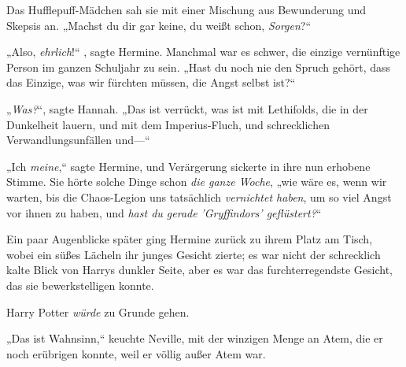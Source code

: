 Das Hufflepuff-Mädchen sah sie mit einer Mischung aus Bewunderung und Skepsis an. „Machst du dir gar keine, du weißt schon, \emph{Sorgen}?“

„Also, \emph{ehrlich}!“ , sagte Hermine. Manchmal war es schwer, die einzige vernünftige Person im ganzen Schuljahr zu sein. „Hast du noch nie den Spruch gehört, dass das Einzige, was wir fürchten müssen, die Angst selbst ist?“

„\emph{Was?}“, sagte Hannah. „Das ist verrückt, was ist mit Lethifolds, die in der Dunkelheit lauern, und mit dem Imperius-Fluch, und schrecklichen Verwandlungsunfällen und—“

„Ich \emph{meine},“ sagte Hermine, und Verärgerung sickerte in ihre nun erhobene Stimme. Sie hörte solche Dinge schon \emph{die ganze Woche}, „wie wäre es, wenn wir warten, bis die Chaos-Legion uns tatsächlich \emph{vernichtet haben}, um so viel Angst vor ihnen zu haben, und \emph{hast du gerade} \emph{'Gryffindors' geflüstert?}“

Ein paar Augenblicke später ging Hermine zurück zu ihrem Platz am Tisch, wobei ein süßes Lächeln ihr junges Gesicht zierte; es war nicht der schrecklich kalte Blick von Harrys dunkler Seite, aber es war das furchterregendste Gesicht, das sie bewerkstelligen konnte.

Harry Potter \emph{würde} zu Grunde gehen.

\later

„Das ist Wahnsinn,“ keuchte Neville, mit der winzigen Menge an Atem, die er noch erübrigen konnte, weil er völlig außer Atem war.

